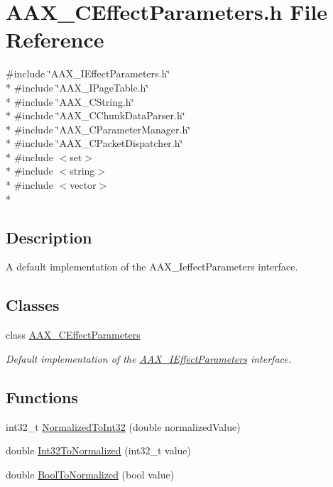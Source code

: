 \hypertarget{a00172}{}\section{A\+A\+X\+\_\+\+C\+Effect\+Parameters.\+h File Reference}
\label{a00172}
{\ttfamily \#include \char`\"{}A\+A\+X\+\_\+\+I\+Effect\+Parameters.\+h\char`\"{}}\\*
{\ttfamily \#include \char`\"{}A\+A\+X\+\_\+\+I\+Page\+Table.\+h\char`\"{}}\\*
{\ttfamily \#include \char`\"{}A\+A\+X\+\_\+\+C\+String.\+h\char`\"{}}\\*
{\ttfamily \#include \char`\"{}A\+A\+X\+\_\+\+C\+Chunk\+Data\+Parser.\+h\char`\"{}}\\*
{\ttfamily \#include \char`\"{}A\+A\+X\+\_\+\+C\+Parameter\+Manager.\+h\char`\"{}}\\*
{\ttfamily \#include \char`\"{}A\+A\+X\+\_\+\+C\+Packet\+Dispatcher.\+h\char`\"{}}\\*
{\ttfamily \#include $<$set$>$}\\*
{\ttfamily \#include $<$string$>$}\\*
{\ttfamily \#include $<$vector$>$}\\*


\subsection{Description}
A default implementation of the A\+A\+X\+\_\+\+Ieffect\+Parameters interface. 

\subsection*{Classes}
\begin{DoxyCompactItemize}
\item 
class \hyperlink{a00018}{A\+A\+X\+\_\+\+C\+Effect\+Parameters}
\begin{DoxyCompactList}\small\item\em Default implementation of the \hyperlink{a00099}{A\+A\+X\+\_\+\+I\+Effect\+Parameters} interface. \end{DoxyCompactList}\end{DoxyCompactItemize}
\subsection*{Functions}
\begin{DoxyCompactItemize}
\item 
int32\+\_\+t \hyperlink{a00172_a4306a7c219b052f8d50910b40247805f}{Normalized\+To\+Int32} (double normalized\+Value)
\item 
double \hyperlink{a00172_aae1cabc9311a708ba440fc539607e68b}{Int32\+To\+Normalized} (int32\+\_\+t value)
\item 
double \hyperlink{a00172_aa07cfc71944518e3d089d18eabdfa4aa}{Bool\+To\+Normalized} (bool value)
\end{DoxyCompactItemize}
